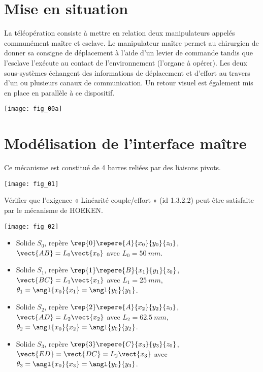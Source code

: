 \section*{Mise en situation}
\ifprof
\else
La téléopération consiste à mettre en relation deux manipulateurs appelés communément
maître et esclave. Le manipulateur maître permet au chirurgien de donner sa consigne de
déplacement à l’aide d’un levier de commande tandis que l’esclave l’exécute au contact de
l’environnement (l’organe à opérer). Les deux sous-systèmes échangent des informations de
déplacement et d’effort au travers d’un ou plusieurs canaux de communication. Un retour
visuel est également mis en place en parallèle à ce dispositif.

\begin{center}
\texttt{[image: fig\_00a]}
\end{center}
\fi

\section*{Modélisation de l’interface maître}
\ifprof
\else

Ce mécanisme est constitué de 4 barres reliées par des liaisons pivots.

\begin{center}
\texttt{[image: fig\_01]}
\end{center}

\begin{obj}
Vérifier que l’exigence « Linéarité couple/effort » (id 1.3.2.2) peut être satisfaite
par le mécanisme de HOEKEN.
\end{obj}


\begin{center}
\texttt{[image: fig\_02]}
\end{center}

\begin{itemize}
\item Solide $S_0$, repère $\rep{0}\repere{A}{x_0}{y_0}{z_0}$, $\vect{AB}=L_0\vect{x_0}$ avec $L_0 = \SI{50}{mm}$.
\item Solide $S_1$, repère $\rep{1}\repere{B}{x_1}{y_1}{z_0}$, $\vect{BC}=L_1\vect{x_1}$ avec $L_1 = \SI{25}{mm}$, $\theta_1=\angl{x_0}{x_1}=\angl{y_0}{y_1}$.
\item Solide $S_2$, repère $\rep{2}\repere{A}{x_2}{y_2}{z_0}$, $\vect{AD}=L_2\vect{x_2}$ avec $L_2 = \SI{62,5}{mm}$, $\theta_2=\angl{x_0}{x_2}=\angl{y_0}{y_2}$.
\item Solide $S_3$, repère $\rep{3}\repere{C}{x_3}{y_3}{z_0}$, $\vect{ED}=\vect{DC}=L_2\vect{x_3}$ avec  $\theta_3=\angl{x_0}{x_3}=\angl{y_0}{y_3}$.
\end{itemize}


